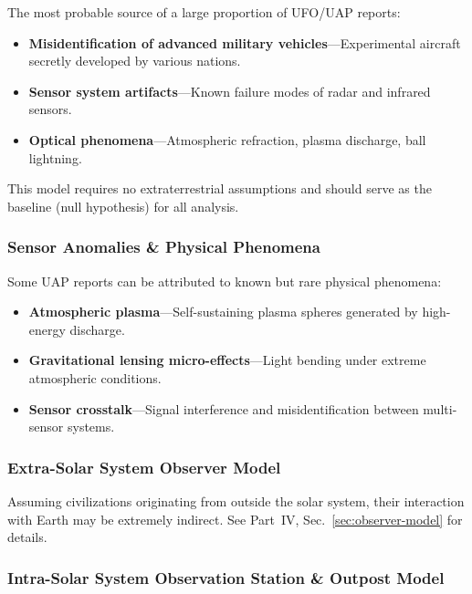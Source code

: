 \documentclass[aps,prd,twocolumn,superscriptaddress,nofootinbib]{revtex4-2}
\begin{document}
The most probable source of a large proportion of UFO/UAP reports:

\begin{itemize}
  \item \textbf{Misidentification of advanced military vehicles}---Experimental aircraft secretly developed by various nations.
  \item \textbf{Sensor system artifacts}---Known failure modes of radar and infrared sensors.
  \item \textbf{Optical phenomena}---Atmospheric refraction, plasma discharge, ball lightning.
\end{itemize}

This model requires no extraterrestrial assumptions and should serve as the baseline (null hypothesis) for all analysis.

\subsubsection{Sensor Anomalies \& Physical Phenomena}\label{sec:sensor-anomalies}

Some UAP reports can be attributed to known but rare physical phenomena:

\begin{itemize}
  \item \textbf{Atmospheric plasma}---Self-sustaining plasma spheres generated by high-energy discharge.
  \item \textbf{Gravitational lensing micro-effects}---Light bending under extreme atmospheric conditions.
  \item \textbf{Sensor crosstalk}---Signal interference and misidentification between multi-sensor systems.
\end{itemize}

\subsubsection{Extra-Solar System Observer Model}\label{sec:extra-solar}

Assuming civilizations originating from outside the solar system, their interaction with Earth may be extremely indirect. See Part~IV, Sec.~\ref{sec:observer-model} for details.

\subsubsection{Intra-Solar System Observation Station \& Outpost Model}\label{sec:intra-solar}
\end{document}
